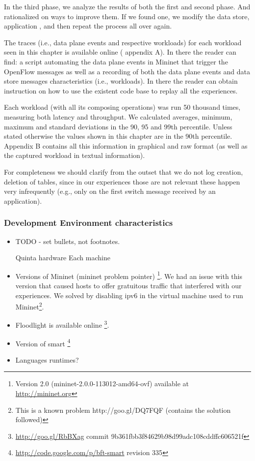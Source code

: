 In the third phase, we analyze the results of both the first and
second phase. And rationalized on ways to improve them. If we found
one, we modify the data store, application , and then repeat the
process all over again. 




The traces (i.e., data plane events and respective workloads) for each workload seen in this chapter is available online (\cite{support} appendix
A). In there the reader can find: a script automating the data plane
events in Mininet that trigger the OpenFlow messages as well as a recording of
both the data plane events and data store messages characteristics
(i.e., workloads). In there the reader can obtain instruction on how
to use the existent code base to replay all the experiences. 


Each workload (with all its composing operations)  was run 50 thousand
times, measuring both latency and throughput. We calculated averages,
minimum, maximum and standard deviations in the 90, 95 and 99th percentile. Unless stated
otherwise the values shown in this chapter are in the 90th
percentile. Appendix B \cite{support}  contains all this information
in graphical and raw format (as well as the captured workload in
textual information). 

For completeness we should clarify from the outset that 
we do not log creation, deletion of tables, since in our experiences those are not relevant  these happen very
infrequently (e.g., only on the first switch message received by an
application). 


\subsubsection{Development Environment characteristics}
\begin{itemize}
\item TODO - set bullets, not footnotes. 
\item[Quinta hardware] Each machine 
\item Versions of Mininet (mininet problem pointer) \footnote{Version
    2.0 (mininet-2.0.0-113012-amd64-ovf) available at
    \url{http://mininet.org}}. We had an issue with this version that
  caused hosts to offer gratuitous traffic that interfered with our
  experiences. We solved by disabling \gls{ipv6} in the virtual
  machine used to run Mininet\footnote{This is a known problem
      http://goo.gl/DQ7FQF
      (contains the solution followed)}. 
\item Floodlight is available online \footnote{\url{http://goo.gl/RbBXag} commit 9b361fbb3f84629b98d99adc108cddffc606521f}. 
\item Version of smart
  \footnote{\url{http://code.google.com/p/bft-smart} revision 335} 
\item Languages runtimes? 
\end{itemize}

